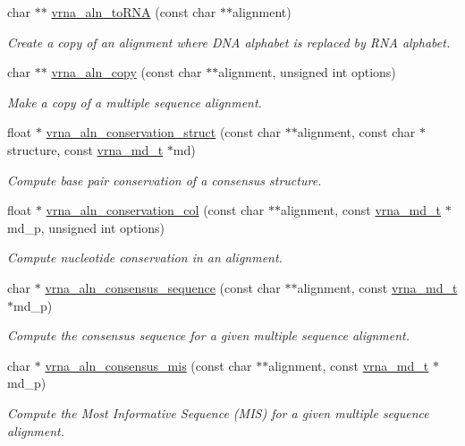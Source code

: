 \begin{DoxyCompactItemize}
char $\ast$$\ast$ \mbox{\hyperlink{group__aln__utils_ga7886fc678553c06472a712a335cde9cf}{vrna\+\_\+aln\+\_\+to\+R\+NA}} (const char $\ast$$\ast$alignment)
\begin{DoxyCompactList}\small\item\em Create a copy of an alignment where D\+NA alphabet is replaced by R\+NA alphabet. \end{DoxyCompactList}\item 
char $\ast$$\ast$ \mbox{\hyperlink{group__aln__utils_ga08cdca592461436860daf9738279ce17}{vrna\+\_\+aln\+\_\+copy}} (const char $\ast$$\ast$alignment, unsigned int options)
\begin{DoxyCompactList}\small\item\em Make a copy of a multiple sequence alignment. \end{DoxyCompactList}\item 
float $\ast$ \mbox{\hyperlink{group__aln__utils_gab6f16a2ea93f3bfd4d089cc8d448bb16}{vrna\+\_\+aln\+\_\+conservation\+\_\+struct}} (const char $\ast$$\ast$alignment, const char $\ast$structure, const \mbox{\hyperlink{group__model__details_ga1f8a10e12a0a1915f2a4eff0b28ea17c}{vrna\+\_\+md\+\_\+t}} $\ast$md)
\begin{DoxyCompactList}\small\item\em Compute base pair conservation of a consensus structure. \end{DoxyCompactList}\item 
float $\ast$ \mbox{\hyperlink{group__aln__utils_gaa12b481a7e7b965ef2eb1bcc4399e759}{vrna\+\_\+aln\+\_\+conservation\+\_\+col}} (const char $\ast$$\ast$alignment, const \mbox{\hyperlink{group__model__details_ga1f8a10e12a0a1915f2a4eff0b28ea17c}{vrna\+\_\+md\+\_\+t}} $\ast$md\+\_\+p, unsigned int options)
\begin{DoxyCompactList}\small\item\em Compute nucleotide conservation in an alignment. \end{DoxyCompactList}\item 
char $\ast$ \mbox{\hyperlink{group__aln__utils_ga1f74eba3006fddd91195456ed1e58483}{vrna\+\_\+aln\+\_\+consensus\+\_\+sequence}} (const char $\ast$$\ast$alignment, const \mbox{\hyperlink{group__model__details_ga1f8a10e12a0a1915f2a4eff0b28ea17c}{vrna\+\_\+md\+\_\+t}} $\ast$md\+\_\+p)
\begin{DoxyCompactList}\small\item\em Compute the consensus sequence for a given multiple sequence alignment. \end{DoxyCompactList}\item 
char $\ast$ \mbox{\hyperlink{group__aln__utils_gad9e74f6549e819f5f330a06d57d45f2a}{vrna\+\_\+aln\+\_\+consensus\+\_\+mis}} (const char $\ast$$\ast$alignment, const \mbox{\hyperlink{group__model__details_ga1f8a10e12a0a1915f2a4eff0b28ea17c}{vrna\+\_\+md\+\_\+t}} $\ast$md\+\_\+p)
\begin{DoxyCompactList}\small\item\em Compute the Most Informative Sequence (M\+IS) for a given multiple sequence alignment. \end{DoxyCompactList}\end{DoxyCompactItemize}


